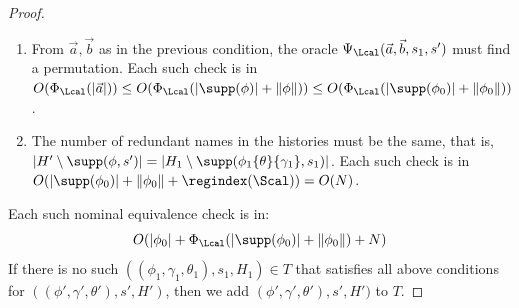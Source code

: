 \begin{proof}
\begin{enumerate}
	 	by Lemma~\ref{lem:genPartialPermF}, this can be constructed in $O(|\phi_0|)$.
		\item From $\vec a, \vec b$ as in the previous condition, the oracle $\Psi_\Lcal(\vec a, \vec b, s_1, s')$ must find a permutation.
		Each such check is in $O(\Phi_\Lcal(|\vec a|)) \le O(\Phi_\Lcal(|\supp(\phi)| + \|\phi\|)) \le O(\Phi_\Lcal(|\supp(\phi_0)| + \|\phi_0\|))$. 
		\item The number of redundant names in the histories must be the same, that is, $|H' \setminus \supp(\phi, s')| = |H_1 \setminus \supp(\phi_1\{\theta\}\{\gamma_1\}, s_1)|$. 
		Each such check is in $O(|\supp(\phi_0)| + \|\phi_0\| + \regindex(\Scal)) = O(N)$.
	\end{enumerate}
	Each such nominal equivalence check is in:
	\[
	O(
	|\phi_0| + \Phi_\Lcal(|\supp(\phi_0)| + \|\phi_0\|) + N
	)
	\]
	If there is no such $((\phi_1, \gamma_1, \theta_1), s_1, H_1) \in T$ that satisfies all above conditions for $((\phi', \gamma', \theta'), s', H')$, then we add $(\phi', \gamma', \theta'), s', H')$ to $T$.
		

\end{proof}
